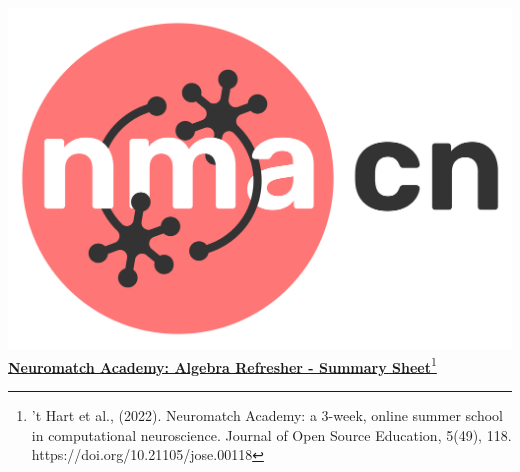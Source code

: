 \includegraphics[scale=0.03]{Figures/NMACN.png}\href{https://compneuro.neuromatch.io/tutorials/intro.html}{\textbf{\Huge{Neuromatch Academy: Algebra Refresher - Summary Sheet}}\footnote{’t Hart et al., (2022). Neuromatch Academy: a 3-week, online summer school in computational neuroscience. Journal of Open Source Education, 5(49), 118. https://doi.org/10.21105/jose.00118}}
\small
